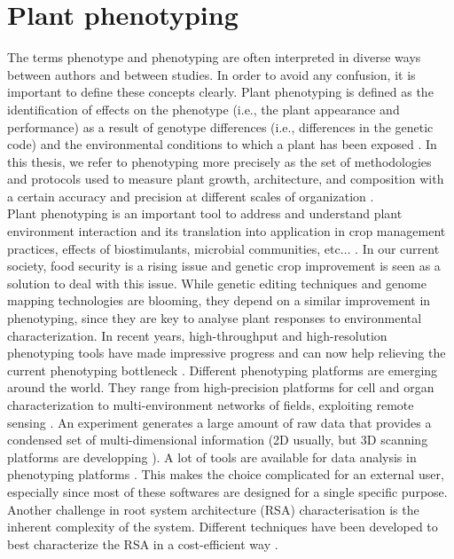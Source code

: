 \section{Plant phenotyping}
The terms phenotype and phenotyping are often interpreted in diverse ways between authors and between studies. In order to avoid any confusion, it is important to define these concepts clearly.
Plant phenotyping is defined as the identification of effects on the phenotype (i.e., the plant appearance and performance) as a result of genotype differences (i.e., differences in the genetic code) and the environmental conditions to which a plant has been exposed \parencite{houle_phenomics:_2010,fiorani_future_2013}. In this thesis, we refer to phenotyping more precisely as the set of methodologies and protocols used to measure plant growth, architecture, and composition with a certain accuracy and precision at different scales of organization \parencite{fiorani_future_2013}.\\
Plant phenotyping is an important tool to address and understand plant environment interaction and its translation into
application in crop management practices, effects of biostimulants, microbial communities, etc$\ldots$
\parencite{pieruschka2019plant}. 
In our current society, food security is a rising issue and genetic crop improvement is seen as a solution to deal with this issue. While genetic editing techniques and genome mapping technologies are blooming, they depend on a similar improvement in phenotyping, since they are key to analyse plant responses to environmental characterization.
In recent years, high-throughput and high-resolution phenotyping tools have made impressive progress and can now help relieving the current phenotyping bottleneck \parencite{tardieu_plant_2017,fiorani_future_2013,furbank_phenomics_2011}.
Different phenotyping platforms are emerging around the world. They range from high-precision platforms for cell and organ characterization \parencite{vargas_mapping_2006} to multi-environment networks of fields, exploiting remote sensing \parencite{virlet_field_2017}. An experiment generates a large amount of raw data that provides a condensed set of multi-dimensional information (2D usually, but 3D scanning platforms are developping \parencite{mooney_developing_2012}). 
A lot of tools are available for data analysis in phenotyping platforms \parencite{lobet_online_2013}. This makes the choice complicated for an external user, especially since most of these softwares are designed for a single specific purpose. Another challenge in root system architecture (RSA) characterisation is the inherent complexity of the system. Different techniques have been developed to best characterize the RSA in a cost-efficient way \parencite{pound_rootnav:_2013,lobet_novel_2013}. 

